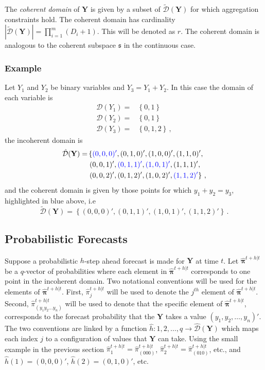 \documentclass[a4paper,review,12pt,authoryear]{elsarticle}
\newcommand{\bY}{\mathbf{Y}}
\newcommand{\bpi}{\bm{\pi}}
\begin{document}
    The \textit{coherent domain} of $\bY$ is given by a subset of $\tilde{\mathcal D}(\bY)$ for which aggregation constraints hold.  The coherent domain has cardinality $|\tilde{\mathcal D}(\bY)|=\prod\limits_{i=1}^{m} (D_i+1)$. This will be denoted as $r$.  The coherent domain is analogous to the coherent subspace $\mathfrak{s}$ in the continuous case.
    
    \subsubsection*{Example}
    
    Let $Y_1$ and $Y_2$ be binary variables and $Y_3=Y_1+Y_2$. In this case the domain of each variable is
    \begin{align*}
      \mathcal{D}(Y_1)=&\left\{0,1\right\}\\
      \mathcal{D}(Y_2)=&\left\{0,1\right\}\\
      \mathcal{D}(Y_3)=&\left\{0,1,2\right\}\,,
    \end{align*}	
    the incoherent domain is
    \begin{align*}
    \hat{\mathcal D}(\bY)=&\left\{\textcolor{blue}{(0,0,0)'},(0,1,0)',(1,0,0)',(1,1,0)',\right.\\
    &\left.(0,0,1)',\textcolor{blue}{(0,1,1)'},\textcolor{blue}{(1,0,1)'},(1,1,1)',\right.\\
    &\left.(0,0,2)',(0,1,2)',(1,0,2)',\textcolor{blue}{(1,1,2)'}\right\}\,,
    \end{align*}
    and the coherent domain is given by those points for which $y_1+y_2=y_3$, highlighted in blue above, i.e
    \[
        \tilde{\mathcal D}(\bY)=\left\{(0,0,0)',(0,1,1)',(1,0,1)',(1,1,2)'\right\}\,.
    \]
    
    \subsection{Probabilistic Forecasts}

    Suppose a probabilistic $h$-step ahead forecast is made for $\bY$ at time $t$. Let $\hat{\bpi}^{t+h|t}$ be a $q$-vector of probabilities where each element in $\hat{\bpi}^{t+h|t}$ corresponds to one point in the incoherent domain. Two notational conventions will be used for the elements of $\hat{\bpi}^{t+h|t}$. First, $\hat{\pi}_j^{t+h|t}$ will be used to denote the $j^{th}$ element of $\hat{\bpi}^{t+h|t}$.  Second, $\hat{\pi}_{(y_1 y_2 \dots y_n)}^{t+h|t}$ will be used to denote that the specific element of $\hat{\bpi}^{t+h|t}$, corresponds to the forecast probability that the $\bY$ takes a value $(y_1,y_2,\dots,y_n)'$. The two conventions are linked by a function $\hat{h}:{1,2,\dots,q}\rightarrow\hat{\mathcal{D}}(\bY)$ which maps each index $j$ to a configuration of values that $\bY$ can take. Using the small example in the previous section $\hat{\pi}_1^{t+h|t}=\hat{\pi}_{(000)}^{t+h|t}$, $\hat{\pi}_2^{t+h|t}=\hat{\pi}_{(010)}^{t+h|t}$, etc., and $\hat{h}(1)=(0,0,0)'$, $\hat{h}(2)=(0,1,0)'$, etc.
    
\end{document}
